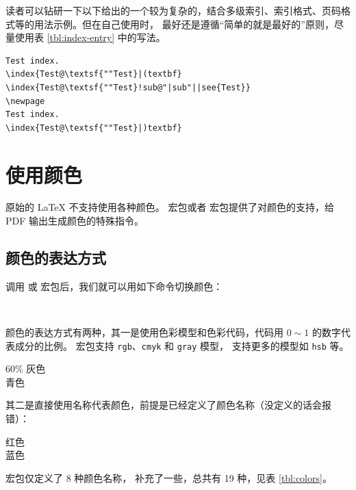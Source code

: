 读者可以钻研一下以下给出的一个较为复杂的，结合多级索引、索引格式、页码格式等的用法示例。但在自己使用时，
最好还是遵循“简单的就是最好的”原则，尽量使用表 \ref{tbl:index-entry} 中的写法。
\begin{verbatim}
Test index.
\index{Test@\textsf{""Test}|(textbf}
\index{Test@\textsf{""Test}!sub@"|sub"||see{Test}}
\newpage
Test index.
\index{Test@\textsf{""Test}|)textbf}
\end{verbatim}

\section{使用颜色}\label{sec:color}

原始的 \LaTeX{} 不支持使用各种颜色。 宏包或者  宏包提供了对颜色的支持，给 PDF 输出生成颜色的特殊指令。

\subsection{颜色的表达方式}\label{subsec:color-code}

调用  或  宏包后，我们就可以用如下命令切换颜色：
\begin{command}
 \\
\end{command}

颜色的表达方式有两种，其一是使用色彩模型和色彩代码，代码用 $0\sim1$ 的数字代表成分的比例。
 宏包支持 \texttt{rgb}、\texttt{cmyk} 和 \texttt{gray} 模型， 支持更多的模型如 \texttt{hsb} 等。
\begin{example}
\large\sffamily
{\color[gray]{0.6}
  60\% 灰色} \\
{\color[rgb]{0,1,1}
  青色}
\end{example}

其二是直接使用名称代表颜色，前提是已经定义了颜色名称（没定义的话会报错）：
\begin{example}
\large\sffamily
{\color{red} 红色} \\
{\color{blue} 蓝色}
\end{example}

 宏包仅定义了 8 种颜色名称， 补充了一些，总共有 19 种，见表 \ref{tbl:colors}。

\def\showcolor#1{%
  \texttt{#1}\index{yanse@颜色!#1@\texttt{#1}}%
  \ \begingroup\fboxsep=0pt\fbox{{\color{#1}\vrule width 1.2em height 1.4ex}}\endgroup}
\def\showxcolor#1{%
  \texttt{#1}\index{yanse@颜色!#1@\texttt{#1} (\pkg{xcolor})}%
  \ \begingroup\fboxsep=0pt\fbox{{\color{#1}\vrule width 1.2em height 1.4ex}}\endgroup}

